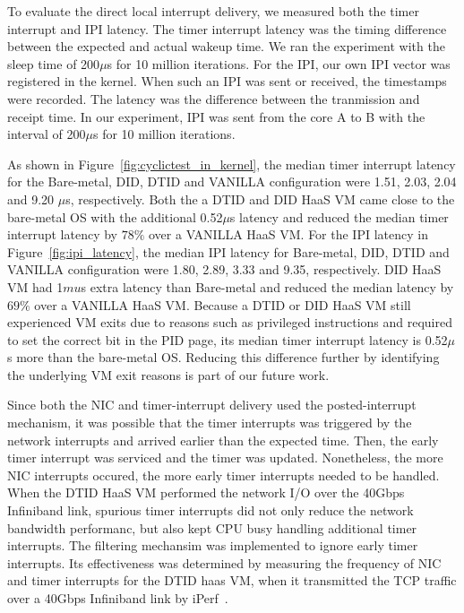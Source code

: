 To evaluate the direct local interrupt delivery, we measured
both the timer interrupt and IPI latency. The timer interrupt
latency was the timing difference between the expected and
actual wakeup time. We ran the experiment with the sleep time
of 200$\mu$s for 10 million iterations. For the IPI, our own
IPI vector was registered in the kernel. When such an IPI was
sent or received, the timestamps were recorded. The latency
was the difference between the tranmission and receipt time.
In our experiment, IPI was sent from the core A to B with the
interval of 200$\mu$s for 10 million iterations.

As shown in Figure~\ref{fig:cyclictest_in_kernel}, the median
timer interrupt latency for the Bare-metal, DID, DTID and
VANILLA configuration were 1.51, 2.03, 2.04 and 9.20 $\mu$s,
respectively. Both the a DTID and DID HaaS VM came close to
the bare-metal OS with the additional 0.52$\mu$s latency and
reduced the median timer interrupt latency by $78\%$ over a
VANILLA HaaS VM. For the IPI latency in
Figure~\ref{fig:ipi_latency}, the median IPI latency for
Bare-metal, DID, DTID and VANILLA configuration were 1.80,
2.89, 3.33 and 9.35, respectively. DID HaaS VM had 1$mu$s
extra latency than Bare-metal and reduced the median latency
by $69\%$ over a VANILLA HaaS VM. Because a DTID or DID HaaS
VM still experienced VM exits due to reasons such as
privileged instructions and required to set the correct bit in
the PID page, its median timer interrupt latency is 0.52$\mu$s
more than the bare-metal OS. Reducing this difference further
by identifying the underlying VM exit reasons is part of our
future work.

Since both the NIC and timer-interrupt delivery used the
posted-interrupt mechanism, it was possible that the timer
interrupts was triggered by the network interrupts and arrived
earlier than the expected time. Then, the early timer
interrupt was serviced and the timer was updated. Nonetheless,
the more NIC interrupts occured, the more early timer
interrupts needed to be handled. When the DTID HaaS VM
performed the network I/O over the 40Gbps Infiniband link,
spurious timer interrupts did not only reduce the network
bandwidth performanc, but also kept CPU busy handling
additional timer interrupts. The filtering mechansim was
implemented to ignore early timer interrupts. Its
effectiveness was determined by measuring the frequency of NIC
and timer interrupts for the DTID haas VM, when it transmitted
the TCP traffic over a 40Gbps Infiniband link by
iPerf~\cite{iperf}.

